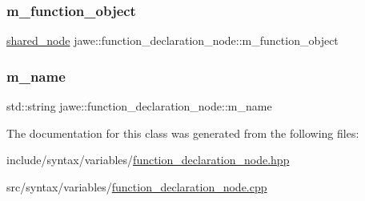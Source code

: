 \subsubsection{\texorpdfstring{m\+\_\+function\+\_\+object}{m\_function\_object}}
{\footnotesize\ttfamily \hyperlink{namespacejawe_a3f307481d921b6cbb50cc8511fc2b544}{shared\+\_\+node} jawe\+::function\+\_\+declaration\+\_\+node\+::m\+\_\+function\+\_\+object\hspace{0.3cm}{\ttfamily [private]}}

\mbox{\label{classjawe_1_1function__declaration__node_a1766e81709b60ebfddc3806728ec2d0c}} 
\subsubsection{\texorpdfstring{m\+\_\+name}{m\_name}}
{\footnotesize\ttfamily std\+::string jawe\+::function\+\_\+declaration\+\_\+node\+::m\+\_\+name\hspace{0.3cm}{\ttfamily [private]}}



The documentation for this class was generated from the following files\+:\begin{DoxyCompactItemize}
\item 
include/syntax/variables/\hyperlink{function__declaration__node_8hpp}{function\+\_\+declaration\+\_\+node.\+hpp}\item 
src/syntax/variables/\hyperlink{function__declaration__node_8cpp}{function\+\_\+declaration\+\_\+node.\+cpp}\end{DoxyCompactItemize}
